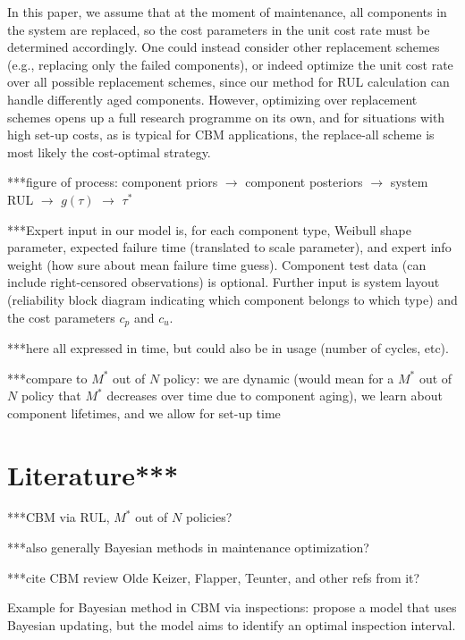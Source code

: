 \documentclass[authoryear]{elsarticle}
\begin{document}
In this paper, we assume that at the moment of maintenance,
all components in the system are replaced,
so the cost parameters in the unit cost rate must be determined accordingly.
One could instead consider other replacement schemes (e.g., replacing only the failed components),
or indeed optimize the unit cost rate over all possible replacement schemes,
since our method for RUL calculation can handle differently aged components. 
However, optimizing over replacement schemes opens up a full research programme on its own,
and for situations with high set-up costs,
as is typical for CBM applications,
the replace-all scheme is most likely the cost-optimal strategy. 


***figure of process: component priors $\to$ component posteriors $\to$ system RUL $\to$ $g(\tau)$ $\to$ $\tau^*$


***Expert input in our model is, for each component type,
Weibull shape parameter, expected failure time (translated to scale parameter),
and expert info weight (how sure about mean failure time guess).
Component test data (can include right-censored observations) is optional.
Further input is system layout (reliability block diagram indicating which component belongs to which type)
and the cost parameters $c_p$ and $c_u$.

***here all expressed in time, but could also be in usage (number of cycles, etc).

***compare to $M^*$ out of $N$ policy:
we are dynamic (would mean for a $M^*$ out of $N$ policy that $M^*$ decreases over time due to component aging),
we learn about component lifetimes,
and we allow for set-up time



\section{Literature***}

***CBM via RUL, $M^*$ out of $N$ policies?

***also generally Bayesian methods in maintenance optimization?

***cite CBM review Olde Keizer, Flapper, Teunter, and other refs from it?


Example for Bayesian method in CBM via inspections: \cite{2007:wang-jia}
propose a model that uses Bayesian updating,
but the model aims to identify an optimal inspection interval.
\end{document}
